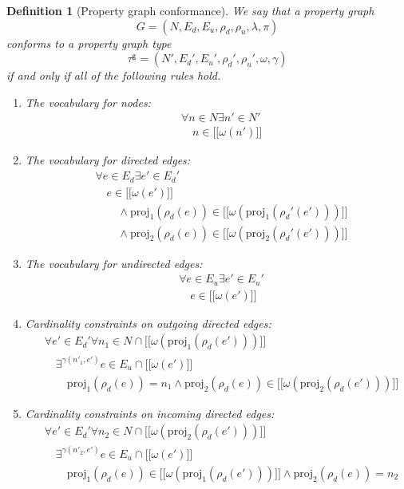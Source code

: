 \documentclass[a4paper]{article}
\newtheorem{definition}[theorem]{Definition}
\newcommand{\proj}{\mathrm{proj}}
\newcommand{\gtype}{\tau^\mathsf{g}}
\newcommand{\lsem}{\ensuremath{[\![}}
\newcommand{\rsem}{\ensuremath{]\!]}}
\newcommand{\sem}[1]{\ensuremath{\lsem #1 \rsem}}
\begin{document}
\begin{definition}[Property graph conformance]
  We say that a property graph \[G = (N, E_d, E_u, \rho_d, \rho_u, \lambda, \pi)\] \emph{conforms} to a property graph type \[\gtype = (N', E_d', E_u', \rho_d', \rho_u', \omega, \gamma)\] if and only if all of the following rules hold.

  \begin{enumerate}
    \item The vocabulary for nodes:
    \begin{align*}
      &\forall n \in N \exists n' \in N'\\
      &\quad n \in \sem{\omega(n')}
    \end{align*}
    
    \item The vocabulary for directed edges:
    \begin{align*}
      &\forall e \in E_d \exists e' \in E_d'\\
      &\quad e \in \sem{\omega(e')}\\
      &\quad\quad\wedge \proj_1(\rho_d(e)) \in \sem{\omega(\proj_1(\rho_d'(e')))}\\
      &\quad\quad\wedge \proj_2(\rho_d(e)) \in \sem{\omega(\proj_2(\rho_d'(e')))}
    \end{align*}

    \item The vocabulary for undirected edges:
    \begin{align*}
      &\forall e \in E_u \exists e' \in E_u'\\
      &\quad e \in \sem{\omega(e')}
    \end{align*}
    
    \item Cardinality constraints on outgoing directed edges:
    \begin{align*}
      &\forall e' \in E_d' \forall n_1 \in N \cap \sem{\omega(\proj_1(\rho_d(e')))}\\
      &\quad\exists^{\gamma(n'_1, e')} e \in E_u \cap \sem{\omega(e')}\\
      &\quad\quad \proj_1(\rho_d(e)) = n_1 \wedge \proj_2(\rho_d(e)) \in \sem{\omega(\proj_2(\rho_d(e')))}
    \end{align*}

    \item Cardinality constraints on incoming directed edges:
    \begin{align*}
      &\forall e' \in E_d' \forall n_2 \in N \cap \sem{\omega(\proj_2(\rho_d(e')))}\\
      &\quad\exists^{\gamma(n'_2, e')} e \in E_u \cap \sem{\omega(e')}\\
      &\quad\quad \proj_1(\rho_d(e)) \in \sem{\omega(\proj_1(\rho_d(e')))} \wedge \proj_2(\rho_d(e)) = n_2
    \end{align*}
    

\end{enumerate}
\end{definition}
\end{document}
